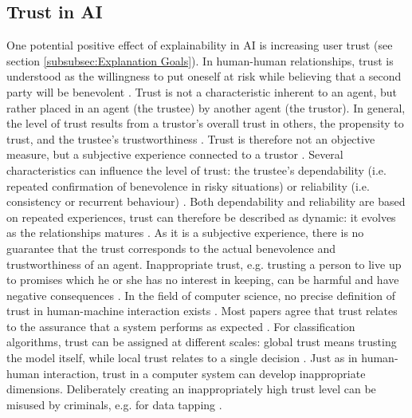 \subsection{Trust in AI}
\label{subsec:trust}
One potential positive effect of explainability in AI is increasing user trust (see section \ref{subsubsec:Explanation Goals}). In human-human relationships, trust is understood as the willingness to put oneself at risk while believing that a second party will be benevolent \cite{rempel1985trust}. Trust is not a characteristic inherent to an agent, but rather placed in an agent (the trustee) by another agent (the trustor). In general, the level of trust results from a trustor's overall trust in others, the propensity to trust, and the trustee's trustworthiness \cite{mayer1995integrative}. Trust is therefore not an objective measure, but a subjective experience connected to a trustor \cite{bedi2006assessing, mohammadi2013trustworthiness}. Several characteristics can influence the level of trust: the trustee's dependability (i.e. repeated confirmation of benevolence in risky situations) or reliability (i.e. consistency or recurrent behaviour) \cite{rempel1985trust}. Both dependability and reliability are based on repeated experiences, trust can therefore be described as dynamic: it evolves as the relationships matures \cite{rempel1985trust}. As it is a subjective experience, there is no guarantee that the trust corresponds to the actual benevolence and trustworthiness of an agent. Inappropriate trust, e.g. trusting a person to live up to promises which he or she has no interest in keeping, can be harmful and have negative consequences \cite{van2001perceived}.\newline
In the field of computer science, no precise definition of trust in human-machine interaction exists \cite{artz2007survey}. Most papers agree that trust relates to the assurance that a system performs as expected \cite{mohammadi2013trustworthiness}. For classification algorithms, trust can be assigned at different scales: global trust means trusting the model itself, while local trust relates to a single decision \cite{ribeiro2016should}. Just as in human-human interaction, trust in a computer system can develop inappropriate dimensions. Deliberately creating an inappropriately high trust level can be misused by criminals, e.g. for data tapping \cite{mohammadi2013trustworthiness}.\newline


